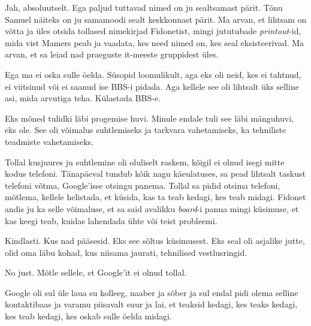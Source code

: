 
Jah, absoluutselt. Ega paljud tuttavad nimed on ju sealtsamast pärit. Tõnu 
Samuel näiteks on ju samamoodi sealt keskkonnast pärit. Ma arvan, et lihtsam on 
võtta ja üles otsida tollased nimekirjad Fidonetist, mingi jututubade 
\emph{printout}-id, mida vist Mamers peab ja vaadata, 
kes need nimed on, kes seal eksisteerivad. Ma arvan, et sa leiad nad praeguste 
it-meeste gruppidest üles.

                 
Ega ma ei oska sulle öelda. Süsopid loomulikult, aga eks oli neid, kes ei 
tahtnud, ei viitsinud või ei saanud ise BBS-i pidada. Aga kellele see oli 
lihtsalt üks selline asi, mida arvutiga teha. Külastada BBS-e.


Eks mõned tulidki läbi progemise huvi. Minule endale tuli see läbi mänguhuvi, 
eks ole. See oli võimalus suhtlemiseks ja tarkvara vahetamiseks,  ka tehniliste 
teadmiste vahetamiseks.

Tollal kusjuures ju suhtlemine oli oluliselt raskem, kõigil ei olnud 
isegi mitte kodus telefoni. Tänapäeval tundub  kõik nagu käeulatuses, sa 
pead lihtsalt taskust telefoni võtma, Google'isse otsingu panema. Tollal sa 
pidid otsima telefoni, mõtlema, kellele helistada, et küsida, kas ta teab 
kedagi, kes teab midagi. Fidonet andis ju ka  selle võimaluse, et sa said 
avalikku \emph{board}-i panna mingi küsimuse, et kas keegi teab, kuidas 
lahendada ühte või teist probleemi.


Kindlasti. Kus nad pääsesid. Eks see sõltus  küsimusest. Eks seal oli asjalike 
jutte, olid oma läbu kohad, kus niisama jaurati, tehnilised vestlusringid.
                 

No just. Mõtle sellele, et Google'it ei olnud tollal.

Google oli sul üle laua su kolleeg, naaber ja sõber ja sul endal pidi olema 
selline kontaktibaas ja varamu piisavalt suur ja lai, et teaksid kedagi, kes 
teaks kedagi, kes teab kedagi, kes oskab sulle öelda midagi.
                 

